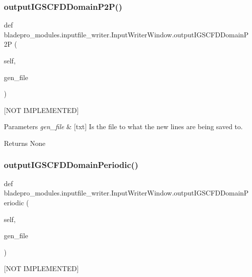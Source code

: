 \subsubsection{\texorpdfstring{output\+I\+G\+S\+C\+F\+D\+Domain\+P2\+P()}{outputIGSCFDDomainP2P()}}
{\footnotesize\ttfamily def bladepro\+\_\+modules.\+inputfile\+\_\+writer.\+Input\+Writer\+Window.\+output\+I\+G\+S\+C\+F\+D\+Domain\+P2P (\begin{DoxyParamCaption}\item[{}]{self,  }\item[{}]{gen\+\_\+file }\end{DoxyParamCaption})}



\mbox{[}N\+OT I\+M\+P\+L\+E\+M\+E\+N\+T\+ED\mbox{]} 


\begin{DoxyParams}{Parameters}
{\em gen\+\_\+file} & \mbox{[}txt\mbox{]} Is the file to what the new lines are being saved to. \\
\hline
\end{DoxyParams}
\begin{DoxyReturn}{Returns}
None 
\end{DoxyReturn}
\hypertarget{a00071_a3093ea91273711f4b82aa878c0204407}{}\label{a00071_a3093ea91273711f4b82aa878c0204407} 
\subsubsection{\texorpdfstring{output\+I\+G\+S\+C\+F\+D\+Domain\+Periodic()}{outputIGSCFDDomainPeriodic()}}
{\footnotesize\ttfamily def bladepro\+\_\+modules.\+inputfile\+\_\+writer.\+Input\+Writer\+Window.\+output\+I\+G\+S\+C\+F\+D\+Domain\+Periodic (\begin{DoxyParamCaption}\item[{}]{self,  }\item[{}]{gen\+\_\+file }\end{DoxyParamCaption})}



\mbox{[}N\+OT I\+M\+P\+L\+E\+M\+E\+N\+T\+ED\mbox{]} 


